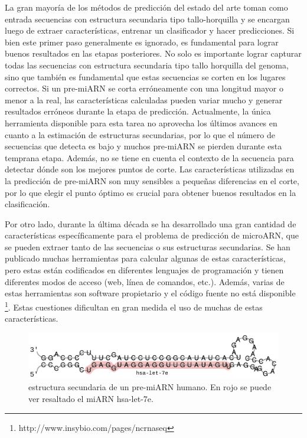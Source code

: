 La gran mayoría de los métodos de predicción del estado del arte toman como entrada secuencias con estructura secundaria tipo tallo-horquilla y se encargan
luego de extraer características, entrenar un clasificador y hacer predicciones. Si bien este primer paso generalmente es ignorado, es fundamental para lograr
buenos resultados en las etapas posteriores. No solo es importante lograr capturar todas las secuencias con estructura secundaria tipo tallo horquilla del
genoma, sino que también es fundamental que estas secuencias se corten en los lugares correctos. Si un pre-miARN se corta erróneamente con una longitud mayor
o menor a la real, las características calculadas pueden variar mucho y generar resultados erróneos durante la etapa de predicción. Actualmente, la única
herramienta disponible para esta tarea \citep{durbin1999einverted} no aprovecha los últimos avances en cuanto a la estimación de estructuras secundarias, por
lo que el número de secuencias que detecta es bajo y muchos pre-miARN se pierden durante esta temprana etapa. Además, no se tiene en cuenta el contexto de la
secuencia para detectar dónde son los mejores puntos de corte. Las características utilizadas en la predicción de pre-miARN son muy sensibles a pequeñas
diferencias en el corte, por lo que elegir el punto óptimo es crucial para obtener buenos resultados en la clasificación.

Por otro lado, durante la última década se ha desarrollado una gran cantidad de características específicamente para el problema de predicción de
microARN, que se pueden extraer tanto de las secuencias o sus estructuras secundarias. Se han publicado muchas herramientas para calcular algunas de estas
características, pero estas están codificados en diferentes lenguajes de programación y tienen diferentes modos de acceso (web, línea de comandos, etc.).
Además, varias de estas herramientas son software propietario y el código fuente no está disponible \footnote{http://www.insybio.com/pages/ncrnaseq}. Estas
cuestiones dificultan en gran medida el uso de muchas de estas características.

\begin{figure}[t]
	\centering
	\includegraphics[width=\textwidth]{fig/mirna.pdf}
	\caption[Estructura secundaria de un pre-miARN]{estructura secundaria de un pre-miARN humano. En rojo se puede ver resaltado el miARN hsa-let-7e.}
	\label{fig:mirna}
\end{figure}

